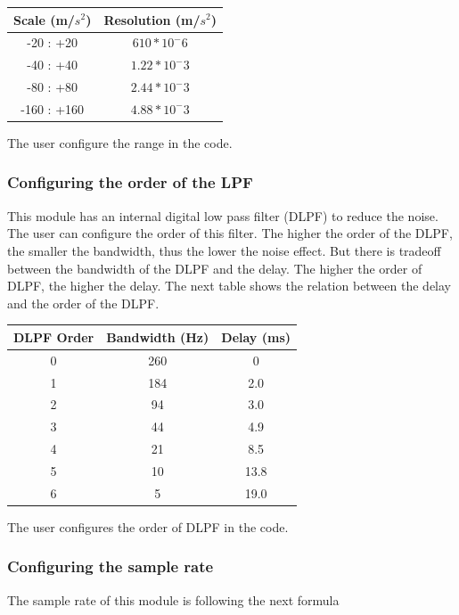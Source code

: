 \begin{table}[h]
\def\arraystretch{1.5}
\centering
\begin{tabular}{| c | c |}
\hline
 \textbf{Scale (m/$s^2$)} &  \textbf{Resolution (m/$s^2$)} \\
 \hline
 -20 : +20 &  $610 * 10 ^ -6$ \\
 \hline
 -40 : +40 & $1.22 * 10 ^ -3$ \\
 \hline
  -80 : +80 & $2.44 * 10 ^ -3$ \\
 \hline
  -160 : +160 & $4.88 * 10 ^ -3$ \\
 \hline
 
\end{tabular}
\end{table}
The user configure the range in the code.
\subsubsection{Configuring the order of the LPF}
This module has an internal digital low pass filter (DLPF) to reduce the noise. The user can configure the order of this filter. The higher the order of the DLPF, the smaller the bandwidth, thus the lower the noise effect. But there is tradeoff between the bandwidth of the DLPF and the delay. The higher the order of DLPF, the higher the delay. The next table shows the relation between the delay and the order of the DLPF.

\begin{table}[h]
\def\arraystretch{1.5}
\centering
\begin{tabular}{| c | c | c |}
\hline
 \textbf{DLPF Order} &  \textbf{Bandwidth (Hz)
}  & \textbf{Delay (ms)}\\
 \hline
 0 &  260 & 0 \\
 \hline
1 &  184 & 2.0 \\
 \hline
 2 &  94 & 3.0 \\
 \hline
3 &  44 & 4.9 \\
 \hline
4 &  21 & 8.5 \\
 \hline
 5 &  10 & 13.8 \\
 \hline
 6 &  5 & 19.0 \\
 \hline

\end{tabular}
\end{table}

The user configures the order of DLPF in the code.
\clearpage
\subsubsection{Configuring the sample rate}
The sample rate of this module is following the next formula

